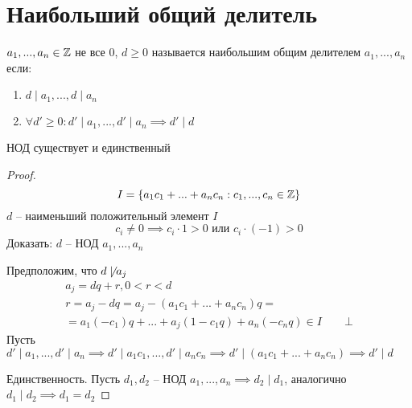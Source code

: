 \documentclass[main]{subfiles}
\begin{document}
\chapter[НОД]{Наибольший общий делитель}

$a_1, ..., a_n \in \mathbb{Z}$ не все $0$, $d\ge 0$ называется наибольшим
общим делителем $a_1, ..., a_n$ если:
\begin{enumerate}
    \item $d \mid a_1, ...,  d\mid  a_n$
    \item $\forall d' \ge 0: d'\mid a_1, ..., d' \mid a_n \implies d'\mid d$
\end{enumerate}

\begin{definition}
    НОД существует и единственный
\end{definition}
\begin{proof}
    \[I = \{a_1 c_1+ ... + a_n c_n: c_1, ..., c_n \in \mathbb{Z}\}\]
    $d$ -- наименьший положительный элемент $I$
    \[c_i \neq 0 \implies c_i \cdot 1 >0 \text{ или } c_i\cdot(-1)>0\]
    Доказать: $d$ -- НОД $a_1, ..., a_n$

    Предположим, что $d \not\mid a_j$
    \begin{gather*}
        a_j = dq+r, 0 < r < d\\
        r = a_j -dq = a_j - (a_1 c_1 + ... + a_n c_n)q=\\
        = a_1 (-c_1)q + ... + a_j(1-c_1q ) + a_n (-c_nq) \in I \qquad \bot
    \end{gather*}
    Пусть $d' \mid a_1, ..., d'\mid a_n \implies d'\mid a_1 c_1, ...,
        d'\mid a_n c_n \implies d' \mid (a_1 c_1 + ... + a_n c_n) \implies d'\mid d$

    Единственность. Пусть $d_1, d_2$ -- НОД $a_1, ..., a_n \implies d_2 \mid d_1$,
    аналогично $d_1\mid d_2 \implies d_1 = d_2$
\end{proof}
\end{document}
